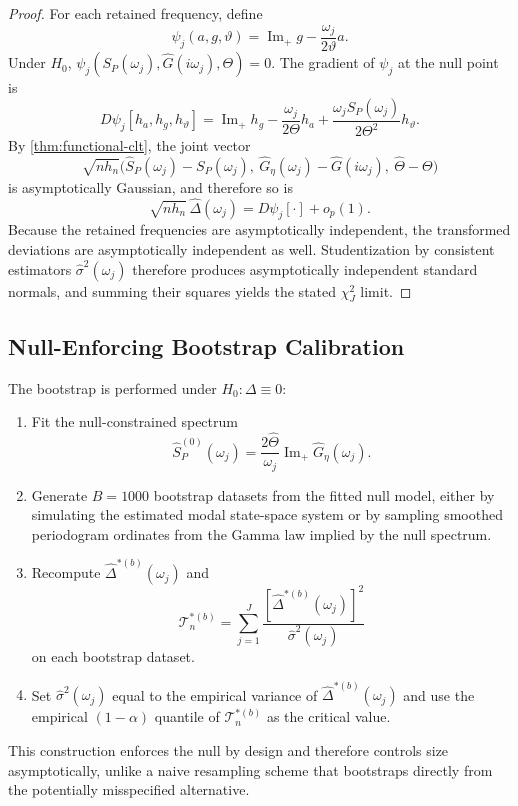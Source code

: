 \documentclass[11pt]{article}
\newcommand{\cT}{\mathcal{T}}
\newcommand{\Ghat}{\widehat{G}}
\newcommand{\ImPart}{\operatorname{Im}_{\!+}}
\newcommand{\REV}{}
\begin{document}
\begin{proof}
\REV
For each retained frequency, define
\[
  \psi_j(a,g,\vartheta)=\ImPart g-\frac{\omega_j}{2\vartheta}a.
\]
Under $H_0$, $\psi_j(S_P(\omega_j),\Ghat(i\omega_j),\Theta)=0$. The gradient of $\psi_j$ at the null point is
\[
  D\psi_j[h_a,h_g,h_\vartheta]
  =
  \ImPart h_g-\frac{\omega_j}{2\Theta}h_a+\frac{\omega_j S_P(\omega_j)}{2\Theta^2}h_\vartheta.
\]
By \cref{thm:functional-clt}, the joint vector
\[
  \sqrt{n h_n}\Big(\widehat S_P(\omega_j)-S_P(\omega_j),\ \widehat G_\eta(\omega_j)-\Ghat(i\omega_j),\ \widehat\Theta-\Theta\Big)
\]
is asymptotically Gaussian, and therefore so is
\[
  \sqrt{n h_n}\,\widehat\Delta(\omega_j)
  =
  D\psi_j[\cdot]+o_p(1).
\]
Because the retained frequencies are asymptotically independent, the transformed deviations are asymptotically independent as well. Studentization by consistent estimators $\widehat\sigma^2(\omega_j)$ therefore produces asymptotically independent standard normals, and summing their squares yields the stated $\chi_J^2$ limit.
\end{proof}

\subsection{Null-Enforcing Bootstrap Calibration}
The bootstrap is performed under $H_0:\Delta\equiv 0$:
\begin{enumerate}[label=\arabic*.]
  \item Fit the null-constrained spectrum
  \[
    \widehat{S}_P^{(0)}(\omega_j)=\frac{2\widehat{\Theta}}{\omega_j}\ImPart \widehat{G}_\eta(\omega_j).
  \]
  \item Generate $B=1000$ bootstrap datasets from the fitted null model, either by simulating the estimated modal state-space system or by sampling smoothed periodogram ordinates from the Gamma law implied by the null spectrum.
  \item Recompute $\widehat{\Delta}^{*(b)}(\omega_j)$ and
  \[
    \cT_n^{*(b)}=\sum_{j=1}^J \frac{[\widehat{\Delta}^{*(b)}(\omega_j)]^2}{\widehat{\sigma}^2(\omega_j)}
  \]
  on each bootstrap dataset.
  \item Set $\widehat{\sigma}^2(\omega_j)$ equal to the empirical variance of $\widehat{\Delta}^{*(b)}(\omega_j)$ and use the empirical $(1-\alpha)$ quantile of $\cT_n^{*(b)}$ as the critical value.
\end{enumerate}
This construction enforces the null by design and therefore controls size asymptotically, unlike a naive resampling scheme that bootstraps directly from the potentially misspecified alternative.
\end{document}
